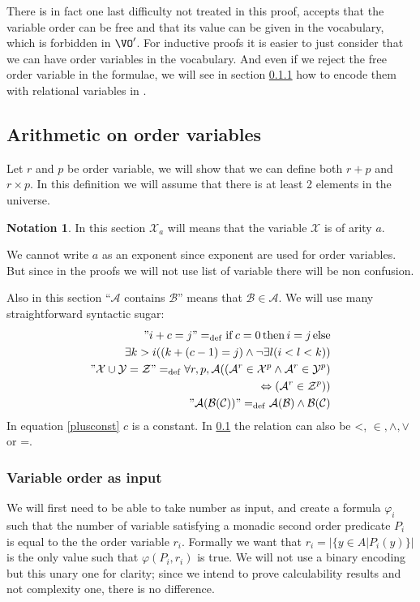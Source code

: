 \documentclass[a4paper,12pt]{article}
\newcommand{\sss}[1]{\subsubsection{#1}}
\theoremstyle{definition}
\newtheorem{notation}[theorem]{Notation}
\renewcommand{\phi}{\varphi}
\DeclareMathOperator{\ifte}{if}
\DeclareMathOperator{\thent}{then}
\DeclareMathOperator{\elset}{else}
\newcommand{\mc}{\mathcal}
\newcommand{\ed}{=_{\mathrm{def}}}
\begin{document}
There is in fact one last difficulty not treated in this proof, \VO{}
accepts that the variable order can be free and that its value can be
given in the vocabulary, which is forbidden in $\VO'$. For inductive
proofs it is easier to just consider that we can have order variables
in the vocabulary. And even if we reject the free order variable in
the formulae, we will see in section \ref{fvo} how to encode them with
relational variables in \VO.  

\subsection{Arithmetic on order variables}\label{iter-rel}
Let $r$ and $p$ be order variable, we will show that we can define
both $r+p$ and $r\times p$. In this definition we will assume that
there is at least 2 elements in the universe.

\begin{notation}
  In this section $\mc X_{a}$ will means that the variable $\mc X$ is
  of arity $a$.
\end{notation}
We cannot write $a$ as an exponent since exponent are used for order
variables. But since in the proofs we will not use list of variable
there will be non confusion.

Also in this section ``$\mc A$ contains $\mc B$'' means that $\mc B\in
\mc A$. We will use many straightforward syntactic sugar:
\begin{eqnarray}
  \label{eq:sugar}
  "i+c=j"\ed \ifte c=0\thent i=j\elset\nonumber\\\exists k>i((k+(c-1)=j)\land \neg\exists l(i<l<k))\label{plusconst}\\
  "\mc{X\cup Y=Z}"\ed\forall r,p,\mc A((\mc A^r\in\mc X^p\land \mc A^r\in\mc Y^p)\nonumber\\
  \Leftrightarrow (\mc A^r\in\mc Z^p))\\
  "\mc{A(B(C))}"\ed \mc {A(B)\land B(C)}
\end{eqnarray}
In equation \ref{plusconst} $c$ is a constant. In \ref{iter-rel} the
relation can also be <, $\in,\land,\lor$ or =.

\sss{Variable order as input}\label{fvo}
We will first need to be able to take number as input, and create a
formula $\phi_i$ such that the number of variable satisfying a monadic
second order predicate $P_i$ is equal to the the order variable
$r_i$. Formally we want that $r_i=|\{y\in A|P_i(y)\}|$ is the only
value such that $\phi(P_i,r_i)$ is true. We will not use a binary
encoding but this unary one for clarity; since we intend to prove
calculability results and not complexity one, there is no difference.
\end{document}
